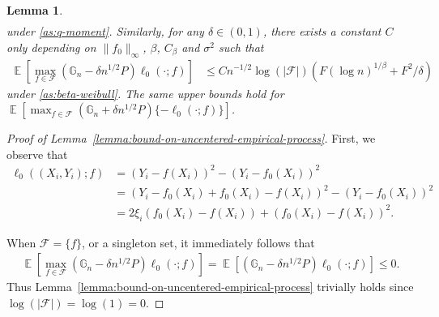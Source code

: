 \documentclass[12pt]{article}
\DeclareMathOperator*{\E}{\mathbb{E}}
\newtheorem{lemma}[theorem]{Lemma}
\begin{document}
\begin{appendices}
\begin{lemma}
\begin{align}
 \end{align}
 under \ref{as:q-moment}. Similarly, for any $\delta \in (0,1)$, there exists a constant $C$ only depending on $\|f_0\|_\infty$, $\beta$, $C_\beta$ and $\sigma^2$ such that
 \begin{align}
     \E\left[\max_{f \in \mathcal{F}}\left(\mathbb{G}_n -\delta n^{1/2}P\right)\ell_0(\cdot; f)\right]&\le Cn^{-1/2}\log (|\mathcal{F}|) \left(F(\log n)^{1/\beta} + F^2/\delta\right) 
 \end{align}
  under \ref{as:beta-weibull}. The same upper bounds hold for $\E\left[\max_{f \in \mathcal{F}}\left(\mathbb{G}_n +\delta n^{1/2}P\right)\{-\ell_0(\cdot; f)\}\right]$.
\end{lemma}
\begin{proof}[Proof of Lemma~\ref{lemma:bound-on-uncentered-empirical-process}]
First, we observe that 
	\begin{align}
		\ell_0((X_i,Y_i); f) &= (Y_i-f(X_i))^2 - (Y_i-f_0(X_i))^2\nonumber\\
		&= (Y_i-f_0(X_i)+f_0(X_i)-f(X_i))^2 - (Y_i-f_0(X_i))^2\nonumber\\
		&=2\xi_i(f_0(X_i)-f(X_i))+(f_0(X_i)-f(X_i))^2. \nonumber
	\end{align}

When $\mathcal{F}=\{f\}$, or a singleton set, it immediately follows that 
\begin{align*}
    \E\left[\max_{f \in \mathcal{F}}\left(\mathbb{G}_n -\delta n^{1/2}P\right)\ell_0(\cdot; f)\right] = \E\left[\left(\mathbb{G}_n -\delta n^{1/2}P\right)\ell_0(\cdot; f)\right] \le 0.
\end{align*}
Thus Lemma~\ref{lemma:bound-on-uncentered-empirical-process} trivially holds since $\log(|\mathcal{F}|)=\log(1)=0$. 


\end{proof}
\end{appendices}
\end{document}
